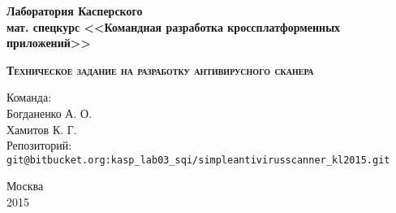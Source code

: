 \begin{titlepage}
\begin{center}
{\bfseries
    Лаборатория Касперского \\
    мат. спецкурс <<Командная разработка кроссплатформенных приложений>>  \\ [5cm]
}

{\scshape \LARGE \bfseries Техническое задание на разработку антивирусного сканера} \\ [1cm]
\end{center}
\begin{flushright}
Команда: \\
Богданенко А. О. \\
Хамитов К. Г. \\ [1cm]
Репозиторий: \\
\verb!git@bitbucket.org:kasp_lab03_sqi/simpleantivirusscanner_kl2015.git!
\end{flushright}
\vfill
\begin{center}
Москва \\
2015
\end{center}
\end{titlepage}
